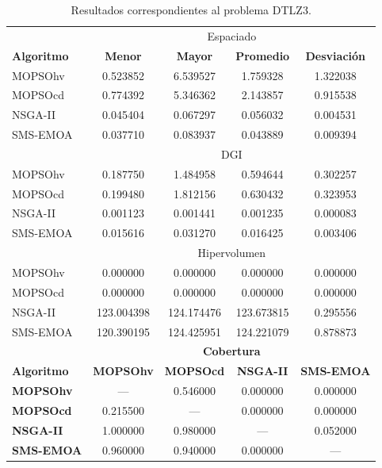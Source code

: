 \begin{table}
 \begin{center}
  \begin{tabular}{|l|cc|cc|} \hline
    & \multicolumn{4}{|c|}{Espaciado} \\ 
	\textbf{Algoritmo} & \textbf{Menor} & \textbf{Mayor} & \textbf{Promedio} & \textbf{Desviaci\'on} \\  \hline \hline
	MOPSOhv &0.523852 & 6.539527 & 1.759328 & 1.322038    \\ 
	MOPSOcd &0.774392 & 5.346362 & 2.143857 & 0.915538   \\ 
	NSGA-II &0.045404 & 0.067297 & 0.056032 & 0.004531   \\  
	SMS-EMOA &0.037710 & 0.083937 & 0.043889 & 0.009394  \\  
	\hline\hline
    & \multicolumn{4}{|c|}{DGI} \\ 
	\hline\hline
	MOPSOhv &0.187750 & 1.484958 & 0.594644 & 0.302257   \\ 
	MOPSOcd &0.199480 & 1.812156 & 0.630432 & 0.323953  \\ 
	NSGA-II &0.001123 & 0.001441 & 0.001235 & 0.000083 \\  
	SMS-EMOA &0.015616 & 0.031270 & 0.016425 & 0.003406  \\  
	\hline\hline
    & \multicolumn{4}{|c|}{Hipervolumen} \\ 
	\hline\hline
	MOPSOhv &0.000000 & 0.000000 & 0.000000 & 0.000000 \\ 
	MOPSOcd &0.000000 & 0.000000 & 0.000000 & 0.000000  \\ 
	NSGA-II &123.004398 & 124.174476 & 123.673815 & 0.295556 \\  
	SMS-EMOA &120.390195 & 124.425951 & 124.221079 & 0.878873  \\  
	\hline\hline
	& \multicolumn{4}{|c|}{\textbf{Cobertura}} \\ \hline\hline 
	\textbf{Algoritmo} & \textbf{MOPSOhv} & \textbf{MOPSOcd} & \textbf{NSGA-II} & \textbf{SMS-EMOA} \\  \hline \hline
	\textbf{MOPSOhv} &---       & 0.546000 & 0.000000   & 0.000000  \\ 
	\textbf{MOPSOcd} & 0.215500 & ---      & 0.000000 & 0.000000 \\ 
	\textbf{NSGA-II} & 1.000000 & 0.980000 & ---        & 0.052000 \\  
	\textbf{SMS-EMOA}& 0.960000 & 0.940000 & 0.000000   & --- \\  
	\hline
	\end{tabular}
\caption{Resultados correspondientes al problema DTLZ3.}
  \label{tab:dtlz3}
\end{center}
\end{table}
\clearpage
\newpage

